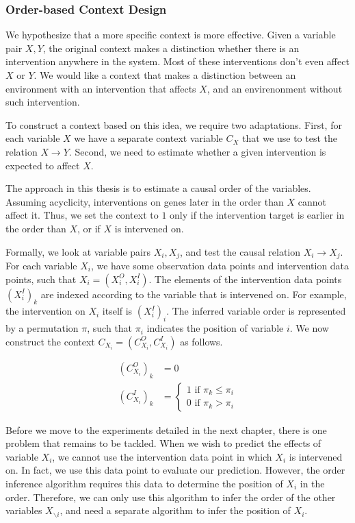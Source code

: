 \subsubsection{Order-based Context Design}

We hypothesize that a more specific context is more effective. Given a variable pair $X,Y$, the original context makes a distinction whether there is an intervention anywhere in the system. Most of these interventions don't even affect $X$ or $Y$. We would like a context that makes a distinction between an environment with an intervention that affects $X$, and an envirenonment without such intervention. 

To construct a context based on this idea, we require two adaptations. First, for each variable $X$ we have a separate context variable $C_X$ that we use to test the relation $X\to Y$. Second, we need to estimate whether a given intervention is expected to affect $X$. 

The approach in this thesis is to estimate a causal order of the variables. Assuming acyclicity, interventions on genes later in the order than $X$ cannot affect it. Thus, we set the context to $1$ only if the intervention target is earlier in the order than $X$, or if $X$ is intervened on. 

Formally, we look at variable pairs $X_i, X_j$, and test the causal relation $X_i\to X_j$. For each variable $X_i$, we have some observation data points and intervention data points, such that $X_i = (X^O_i, X^I_i)$. The elements of the intervention data points $(X^I_i)_k$ are indexed according to the variable that is intervened on. For example, the intervention on $X_i$ itself is $(X^I_i)_i$. The inferred variable order is represented by a permutation $\pi$, such that $\pi_i$ indicates the position of variable $i$. We now construct the context $C_{X_i} = (C^O_{X_i}, C^I_{X_i})$ as follows.

$$\begin{array}{ll}
(C^O_{X_i})_k & =0 \\
(C^I_{X_i})_k & = \begin{cases}
    1 \text{ if } \pi_k\leq \pi_i \\
    0 \text{ if } \pi_k> \pi_i    
\end{cases}
\end{array}$$

Before we move to the experiments detailed in the next chapter, there is one problem that remains to be tackled. When we wish to predict the effects of variable $X_i$, we cannot use the intervention data point in which $X_i$ is intervened on. In fact, we use this data point to evaluate our prediction. However, the order inference algorithm requires this data to determine the position of $X_i$ in the order. Therefore, we can only use this algorithm to infer the order of the other variables $X_{\backslash i}$, and need a separate algorithm to infer the position of $X_i$.


